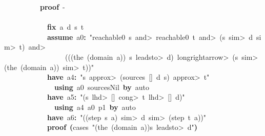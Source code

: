 \documentclass{article}
\newcommand{\syntaxKEYWORDA}[1]{\textcolor[rgb]{0.0,0.4,0.6}{\textbf{#1}}}
\newcommand{\syntaxKEYWORDC}[1]{\textcolor[rgb]{0.0,0.6,1.0}{\textbf{#1}}}
\newcommand{\syntaxLITERALA}[1]{\textcolor[rgb]{1.0,0.0,0.8}{#1}}
\newcommand{\syntaxOPERATOR}[1]{\textcolor[rgb]{0.0,0.0,0.0}{\textbf{#1}}}
\newcommand{\syntaxKEYWORDA}[1]{\textcolor[rgb]{0.0,0.4,0.6}{\textbf{#1}}}
\newcommand{\syntaxKEYWORDC}[1]{\textcolor[rgb]{0.0,0.6,1.0}{\textbf{#1}}}
\newcommand{\syntaxLITERALA}[1]{\textcolor[rgb]{1.0,0.0,0.8}{#1}}
\newcommand{\syntaxOPERATOR}[1]{\textcolor[rgb]{0.0,0.0,0.0}{\textbf{#1}}}
\newcommand{\syntaxKEYWORDA}[1]{\textcolor[rgb]{0.0,0.4,0.6}{\textbf{#1}}}
\newcommand{\syntaxKEYWORDC}[1]{\textcolor[rgb]{0.0,0.6,1.0}{\textbf{#1}}}
\newcommand{\syntaxLITERALA}[1]{\textcolor[rgb]{1.0,0.0,0.8}{#1}}
\newcommand{\syntaxOPERATOR}[1]{\textcolor[rgb]{0.0,0.0,0.0}{\textbf{#1}}}
\newcommand{\syntaxKEYWORDA}[1]{\textcolor[rgb]{0.0,0.4,0.6}{#1}}
\newcommand{\syntaxKEYWORDC}[1]{\textcolor[rgb]{0.0,0.6,1.0}{#1}}
\newcommand{\syntaxLITERALA}[1]{\textcolor[rgb]{1.0,0.0,0.8}{\textbf{#1}}}
\newcommand{\syntaxOPERATOR}[1]{\textcolor[rgb]{0.0,0.0,0.0}{#1}}
\newcommand{\syntaxKEYWORDA}[1]{\textcolor[rgb]{0.0,0.4,0.6}{\textbf{#1}}}
\newcommand{\syntaxKEYWORDC}[1]{\textcolor[rgb]{0.0,0.6,1.0}{\textbf{#1}}}
\newcommand{\syntaxLITERALA}[1]{\textcolor[rgb]{1.0,0.0,0.8}{#1}}
\newcommand{\syntaxOPERATOR}[1]{\textcolor[rgb]{0.0,0.0,0.0}{\textbf{#1}}}
\newcommand{\syntaxKEYWORDA}[1]{\textcolor[rgb]{0.0,0.4,0.6}{\textbf{#1}}}
\newcommand{\syntaxKEYWORDC}[1]{\textcolor[rgb]{0.0,0.6,1.0}{\textbf{#1}}}
\newcommand{\syntaxLITERALA}[1]{\textcolor[rgb]{1.0,0.0,0.8}{#1}}
\newcommand{\syntaxOPERATOR}[1]{\textcolor[rgb]{0.0,0.0,0.0}{\textbf{#1}}}
\begin{document}
{\ }{\ }{\ }{\ }{\ }{\ }{\ }{\ }{\ }{\ }\syntaxKEYWORDA{proof}{\ }{-}\hspace*{\fill}\\
{\ }{\ }{\ }{\ }{\ }{\ }{\ }{\ }{\ }{\ }\syntaxKEYWORDA{\usebox{\opencurlybracket}}\hspace*{\fill}\\
{\ }{\ }{\ }{\ }{\ }{\ }{\ }{\ }{\ }{\ }{\ }{\ }\syntaxKEYWORDC{fix}{\ }a{\ }d{\ }s{\ }t\hspace*{\fill}\\
{\ }{\ }{\ }{\ }{\ }{\ }{\ }{\ }{\ }{\ }{\ }{\ }\syntaxKEYWORDC{assume}{\ }a0\syntaxOPERATOR{:}{\ }\syntaxLITERALA{"reachable0{\ }s{\ }\<and>{\ }reachable0{\ }t{\ }\<and>{\ }(s{\ }\<sim>{\ }d{\ }\<sim>{\ }t){\ }\<and>{\ }}\hspace*{\fill}\\
\syntaxLITERALA{{\ }{\ }{\ }{\ }{\ }{\ }{\ }{\ }{\ }{\ }{\ }{\ }{\ }{\ }{\ }{\ }{\ }(((the{\ }(domain{\ }a)){\ }\usebox{\atbox}{\ }s{\ }\<leadsto>{\ }d){\ }\<longrightarrow>{\ }(s{\ }\<sim>{\ }(the{\ }(domain{\ }a)){\ }\<sim>{\ }t))"}\hspace*{\fill}\\
{\ }{\ }{\ }{\ }{\ }{\ }{\ }{\ }{\ }{\ }{\ }{\ }\syntaxKEYWORDA{have}{\ }a4\syntaxOPERATOR{:}{\ }\syntaxLITERALA{"s{\ }\<approx>{\ }(sources{\ }{[}{]}{\ }d{\ }s){\ }\<approx>{\ }t"}\hspace*{\fill}\\
{\ }{\ }{\ }{\ }{\ }{\ }{\ }{\ }{\ }{\ }{\ }{\ }{\ }{\ }\syntaxKEYWORDA{using}{\ }a0{\ }sources\usebox{\underscorebox}Nil{\ }\syntaxKEYWORDA{by}{\ }auto\hspace*{\fill}\\
{\ }{\ }{\ }{\ }{\ }{\ }{\ }{\ }{\ }{\ }{\ }{\ }\syntaxKEYWORDA{have}{\ }a5\syntaxOPERATOR{:}{\ }\syntaxLITERALA{"(s{\ }\<lhd>{\ }{[}{]}{\ }\<cong>{\ }t{\ }\<lhd>{\ }{[}{]}{\ }\usebox{\atbox}{\ }d)"}\hspace*{\fill}\\
{\ }{\ }{\ }{\ }{\ }{\ }{\ }{\ }{\ }{\ }{\ }{\ }{\ }{\ }\syntaxKEYWORDA{using}{\ }a4{\ }a0{\ }p1{\ }\syntaxKEYWORDA{by}{\ }auto\hspace*{\fill}\\
{\ }{\ }{\ }{\ }{\ }{\ }{\ }{\ }{\ }{\ }{\ }{\ }\syntaxKEYWORDA{have}{\ }a6\syntaxOPERATOR{:}{\ }\syntaxLITERALA{"((step{\ }s{\ }a){\ }\<sim>{\ }d{\ }\<sim>{\ }(step{\ }t{\ }a))"}\hspace*{\fill}\\
{\ }{\ }{\ }{\ }{\ }{\ }{\ }{\ }{\ }{\ }{\ }{\ }\syntaxKEYWORDA{proof}{\ }\syntaxOPERATOR{(}cases{\ }\syntaxLITERALA{"(the{\ }(domain{\ }a))\usebox{\atbox}s{\ }\<leadsto>{\ }d"}\syntaxOPERATOR{)}\hspace*{\fill}\\
\end{document}
